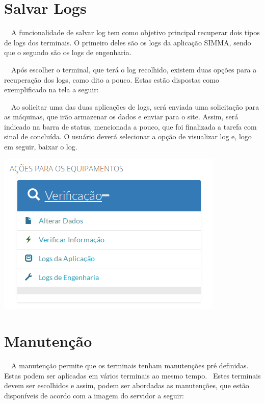     \bigskip

    \section{Salvar Logs}
{\color{black}
    \ \ A funcionalidade de salvar log tem como objetivo principal recuperar dois tipos de logs dos terminais. O primeiro
        deles s\~ao os logs da aplica\c{c}\~ao SIMMA, sendo que o segundo s\~ao os logs de engenharia. }

{\color{black}
    \ \ Ap\'os escolher o terminal, que ter\'a o log recolhido, existem duas op\c{c}\~oes para a recupera\c{c}\~ao dos logs,
        como dito a pouco. Estas est\~ao dispostas como exemplificado na tela a seguir:}


        \bigskip

{\color{black}
    \ \ Ao solicitar uma das duas aplica\c{c}\~oes de logs, ser\'a enviada uma solicita\c{c}\~ao para as m\'aquinas, que
        ir\~ao armazenar os dados e enviar para o site. Assim, ser\'a indicado na barra de status, mencionada a pouco, que foi
        finalizada a tarefa com sinal de conclu\'ida. O usu\'ario dever\'a selecionar a op\c{c}\~ao de visualizar log e, logo
        em seguir, baixar o log. }

        \begin{center}
        \includegraphics[width=10.82cm,height=7.777cm]{figuras/RATCETECATMSTFLS051718v2-img008.png}
        \end{center}

        \bigskip

        \section{Manuten\c{c}\~ao}
{\color{black}
    \ \ A manuten\c{c}\~ao permite que os terminais tenham manuten\c{c}\~oes pr\'e definidas. Estas podem ser aplicadas em
        v\'arios terminais ao mesmo tempo. \ Estes terminais devem ser escolhidos e assim, podem ser abordadas as
        manuten\c{c}\~oes, que est\~ao dispon\'iveis de acordo com a imagem do servidor a seguir:}


